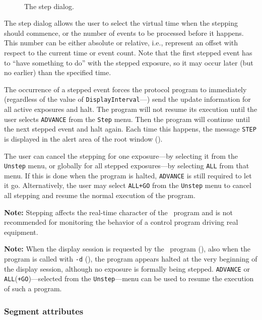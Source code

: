 \begin{figure}[htbp]%
\begin{center}
\ 
\caption{The step dialog.\label{fig.dsdstep}}%
\end{center}
\end{figure}%

The step dialog allows the user to select the virtual time when the
stepping should commence, or the number of events to be processed before
it happens.
This number can be either absolute or relative, i.e., represent an offset
with respect to the current time or event count.
Note that the first stepped event has to ``have something to do'' with the
stepped exposure, so it may occur later (but no earlier)
than the specified time.

The occurrence of a stepped event forces the protocol program to
immediately (regardless of the value of
{\tt DisplayInterval}---) send the update information for
all active exposures and halt.
The program will not resume its execution until the user selects
{\tt ADVANCE} from the {\tt Step} menu.
Then the program will continue until the next stepped event and halt again.
Each time this happens, the message {\tt STEP} is displayed in the
alert area of the root window ().

The user can cancel the stepping for one exposure---by selecting it from the
{\tt Unstep} menu, or globally for all stepped exposures---by selecting
{\tt ALL} from that menu.
If this is done when the program is halted, {\tt ADVANCE} is still required
to let it go.
Alternatively, the user may select {\tt ALL+GO} from the {\tt Unstep}
menu to cancel all stepping and resume the normal execution of the program.

\medskip
\noindent
{\bf Note:}
Stepping affects the real-time character of the \smurph\ program and is not
recommended for monitoring the behavior of a control
program driving real equipment.

\medskip
\noindent
{\bf Note:}
When the display session is requested by the \smurph\ program
(), also when the program is called with {\tt -d} 
(), the program appears halted at the very beginning of the
display session, although no exposure is formally being stepped.
{\tt ADVANCE} or {\tt ALL}({\tt +GO})---selected from the
{\tt Unstep}---menu can be used to resume the execution of such a program.

\subsubsection{Segment attributes}
\label{rm_ds_sa}


